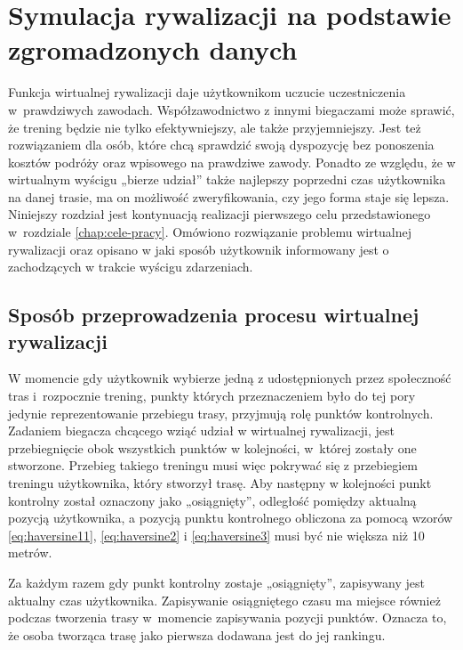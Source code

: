 \chapter{Symulacja rywalizacji na podstawie zgromadzonych danych}\label{chap:symulacja-rywalizacji}
Funkcja wirtualnej rywalizacji daje użytkownikom uczucie uczestniczenia w~prawdziwych zawodach. Współzawodnictwo z innymi biegaczami może sprawić, że trening będzie nie tylko efektywniejszy, ale także przyjemniejszy. Jest też rozwiązaniem dla osób, które chcą sprawdzić swoją dyspozycję bez ponoszenia kosztów podróży oraz wpisowego na prawdziwe zawody. Ponadto ze względu, że w wirtualnym wyścigu „bierze udział” także najlepszy poprzedni czas użytkownika na danej trasie, ma on możliwość zweryfikowania, czy jego forma staje się lepsza. Niniejszy rozdział jest kontynuacją realizacji pierwszego celu przedstawionego w~rozdziale \ref{chap:cele-pracy}. Omówiono rozwiązanie problemu wirtualnej rywalizacji oraz opisano w jaki sposób użytkownik informowany jest o zachodzących w trakcie wyścigu zdarzeniach.
\section{Sposób przeprowadzenia procesu wirtualnej rywalizacji}\label{chapter:sposob-rywalizacji}
W momencie gdy użytkownik wybierze jedną z udostępnionych przez społeczność tras i~rozpocznie trening, punkty których przeznaczeniem było do tej pory jedynie reprezentowanie przebiegu trasy, przyjmują rolę punktów kontrolnych. Zadaniem biegacza chcącego wziąć udział w wirtualnej rywalizacji, jest przebiegnięcie obok wszystkich punktów w kolejności, w~której zostały one stworzone. Przebieg takiego treningu musi więc pokrywać się z przebiegiem treningu użytkownika, który stworzył trasę. Aby następny w kolejności punkt kontrolny został oznaczony jako „osiągnięty”, odległość pomiędzy aktualną pozycją użytkownika, a pozycją punktu kontrolnego obliczona za pomocą wzorów \ref{eq:haversine11},  \ref{eq:haversine2} i \ref{eq:haversine3} musi być nie większa niż 10 metrów.

Za każdym razem gdy punkt kontrolny zostaje „osiągnięty”, zapisywany jest aktualny czas użytkownika. Zapisywanie osiągniętego czasu ma miejsce również podczas tworzenia trasy w~momencie zapisywania pozycji punktów. Oznacza to, że osoba tworząca trasę jako pierwsza dodawana jest do jej rankingu.

